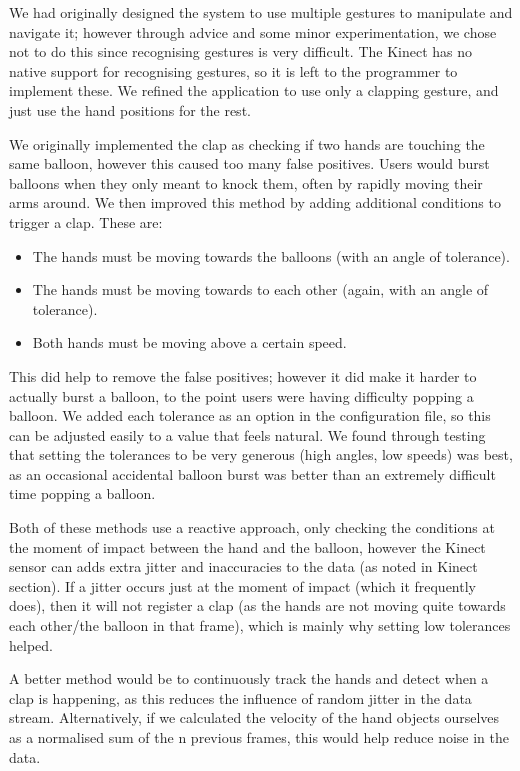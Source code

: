 We had originally designed the system to use multiple gestures to manipulate and navigate it; however through advice and some minor experimentation, we chose not to do this since recognising gestures is very difficult. The Kinect has no native support for recognising gestures, so it is left to the programmer to implement these. We refined the application to use only a clapping gesture, and just use the hand positions for the rest.

We originally implemented the clap as checking if two hands are touching the same balloon, however this caused too many false positives. Users would burst balloons when they only meant to knock them, often by rapidly moving their arms around.
We then improved this method by adding additional conditions to trigger a clap. These are:

\begin{itemize}
\item{The hands must be moving towards the balloons (with an angle of tolerance).}
\item{The hands must be moving towards to each other (again, with an angle of tolerance).}
\item{Both hands must be moving above a certain speed.}
\end{itemize}

This did help to remove the false positives; however it did make it harder to actually burst a balloon, to the point users were having difficulty popping a balloon. We added each tolerance as an option in the configuration file, so this can be adjusted easily to a value that feels natural. We found through testing that setting the tolerances to be very generous (high angles, low speeds) was best, as an occasional accidental balloon burst was better than an extremely difficult time popping a balloon.

Both of these methods use a reactive approach, only checking the conditions at the moment of impact between the hand and the balloon, however the Kinect sensor can adds extra jitter and inaccuracies to the data (as noted in Kinect section). If a jitter occurs just at the moment of impact (which it frequently does), then it will not register a clap (as the hands are not moving quite towards each other/the balloon in that frame), which is mainly why setting low tolerances helped.

A better method would be to continuously track the hands and detect when a clap is happening, as this reduces the influence of random jitter in the data stream. Alternatively, if we calculated the velocity of the hand objects ourselves as a normalised sum of the n previous frames, this would help reduce noise in the data.
 
